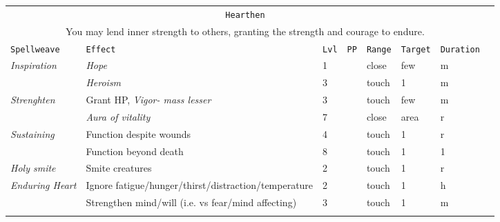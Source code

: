 \documentclass[10pt,a4paper]{article}
\begin{document}
\begin{table}[htbp!]
\begin{tabular}{llllllll}
    	
    \multicolumn{7}{c}{\texttt{Hearthen}}\\
    \multicolumn{7}{c}{You may lend inner strength to others, granting the strength and courage to endure.}\\
    \hline
    \texttt{Spellweave} & \texttt{Effect} & \texttt{Lvl} & \texttt{PP} & \texttt{Range} & \texttt{Target} & \texttt{Duration} \\
    \hline
    \multirow{1}{*}{\textit{Inspiration}} & \textit{Hope} & 1 && close & few & m\\
									     & \textit{Heroism} & 3 && touch & 1 & m\\					    
 	\hline
    \multirow{1}{*}{\textit{Strenghten}} & Grant HP, \textit{Vigor- mass lesser} & 3 && touch & few & m\\
                                         & \textit{Aura of vitality} & 7 && close & area & r\\
    \hline
    \multirow{1}{*}{\textit{Sustaining}} & Function despite wounds & 4 && touch & 1 & r\\
   									    & Function beyond death & 8 && touch & 1 & 1\\
    \hline
    \multirow{1}{*}{\textit{Holy smite}} & Smite creatures & 2 && touch & 1 & r\\
    \hline
    \multirow{1}{*}{\textit{Enduring Heart}} & Ignore fatigue/hunger/thirst/distraction/temperature & 2 && touch & 1 & h\\
										    & Strengthen mind/will (i.e. vs fear/mind affecting)& 3 && touch & 1 & m\\
    	&&&&&&\\
    	

\end{tabular}
\end{table}
\end{document}
